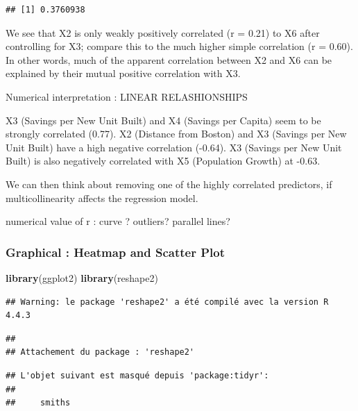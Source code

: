 \documentclass[
  12pt,
]{article}
\newenvironment{Shaded}{\begin{snugshade}}{\end{snugshade}}
\newcommand{\FunctionTok}[1]{\textcolor[rgb]{0.13,0.29,0.53}{\textbf{#1}}}
\newcommand{\NormalTok}[1]{#1}
\begin{document}
\begin{verbatim}
## [1] 0.3760938
\end{verbatim}

We see that X2 is only weakly positively correlated (r = 0.21) to X6
after controlling for X3; compare this to the much higher simple
correlation (r = 0.60). In other words, much of the apparent correlation
between X2 and X6 can be explained by their mutual positive correlation
with X3.

Numerical interpretation : LINEAR RELASHIONSHIPS

X3 (Savings per New Unit Built) and X4 (Savings per Capita) seem to be
strongly correlated (0.77). X2 (Distance from Boston) and X3 (Savings
per New Unit Built) have a high negative correlation (-0.64). X3
(Savings per New Unit Built) is also negatively correlated with X5
(Population Growth) at -0.63.

We can then think about removing one of the highly correlated
predictors, if multicollinearity affects the regression model.

numerical value of r : curve ? outliers? parallel lines?

\subsubsection{Graphical : Heatmap and Scatter
Plot}\label{graphical-heatmap-and-scatter-plot}

\begin{Shaded}
\begin{Highlighting}[]
\FunctionTok{library}\NormalTok{(ggplot2)}
\FunctionTok{library}\NormalTok{(reshape2)}
\end{Highlighting}
\end{Shaded}

\begin{verbatim}
## Warning: le package 'reshape2' a été compilé avec la version R 4.4.3
\end{verbatim}

\begin{verbatim}
## 
## Attachement du package : 'reshape2'
\end{verbatim}

\begin{verbatim}
## L'objet suivant est masqué depuis 'package:tidyr':
## 
##     smiths
\end{verbatim}
\end{document}
